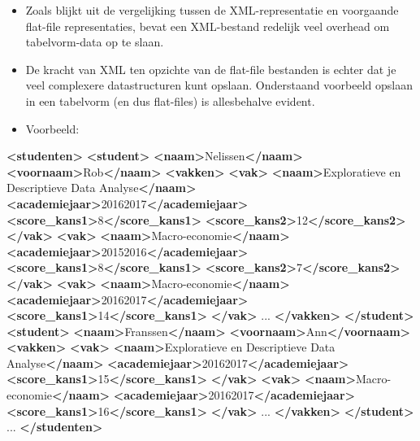 \documentclass[]{tufte-book}
\newenvironment{Shaded}{}{}
\newcommand{\KeywordTok}[1]{\textcolor[rgb]{0.00,0.44,0.13}{\textbf{#1}}}
\newcommand{\NormalTok}[1]{#1}
\providecommand{\tightlist}{%
  \setlength{\itemsep}{0pt}\setlength{\parskip}{0pt}}
\begin{document}
\begin{itemize}
\tightlist
\item
  Zoals blijkt uit de vergelijking tussen de XML-representatie en voorgaande flat-file representaties, bevat een XML-bestand redelijk veel overhead om tabelvorm-data op te slaan.
\item
  De kracht van XML ten opzichte van de flat-file bestanden is echter dat je veel complexere datastructuren kunt opslaan. Onderstaand voorbeeld opslaan in een tabelvorm (en dus flat-files) is allesbehalve evident.
\item
  Voorbeeld:
\end{itemize}

\begin{Shaded}
\begin{Highlighting}[]
\KeywordTok{<studenten>}
  \KeywordTok{<student>}
    \KeywordTok{<naam>}\NormalTok{Nelissen}\KeywordTok{</naam>}
    \KeywordTok{<voornaam>}\NormalTok{Rob}\KeywordTok{</naam>}
    \KeywordTok{<vakken>}
      \KeywordTok{<vak>}
        \KeywordTok{<naam>}\NormalTok{Exploratieve en Descriptieve Data Analyse}\KeywordTok{</naam>}
        \KeywordTok{<academiejaar>}\NormalTok{20162017}\KeywordTok{</academiejaar>}
        \KeywordTok{<score_kans1>}\NormalTok{8}\KeywordTok{</score_kans1>}
        \KeywordTok{<score_kans2>}\NormalTok{12}\KeywordTok{</score_kans2>}
      \KeywordTok{</vak>}
      \KeywordTok{<vak>}
        \KeywordTok{<naam>}\NormalTok{Macro-economie}\KeywordTok{</naam>}
        \KeywordTok{<academiejaar>}\NormalTok{20152016}\KeywordTok{</academiejaar>}
        \KeywordTok{<score_kans1>}\NormalTok{8}\KeywordTok{</score_kans1>}
        \KeywordTok{<score_kans2>}\NormalTok{7}\KeywordTok{</score_kans2>}
      \KeywordTok{</vak>}
      \KeywordTok{<vak>}
        \KeywordTok{<naam>}\NormalTok{Macro-economie}\KeywordTok{</naam>}
        \KeywordTok{<academiejaar>}\NormalTok{20162017}\KeywordTok{</academiejaar>}
        \KeywordTok{<score_kans1>}\NormalTok{14}\KeywordTok{</score_kans1>}
      \KeywordTok{</vak>}
\NormalTok{      ...}
    \KeywordTok{</vakken>}
  \KeywordTok{</student>}
  \KeywordTok{<student>}
    \KeywordTok{<naam>}\NormalTok{Franssen}\KeywordTok{</naam>}
    \KeywordTok{<voornaam>}\NormalTok{Ann}\KeywordTok{</voornaam>}
    \KeywordTok{<vakken>}
      \KeywordTok{<vak>}
        \KeywordTok{<naam>}\NormalTok{Exploratieve en Descriptieve Data Analyse}\KeywordTok{</naam>}
        \KeywordTok{<academiejaar>}\NormalTok{20162017}\KeywordTok{</academiejaar>}
        \KeywordTok{<score_kans1>}\NormalTok{15}\KeywordTok{</score_kans1>}
      \KeywordTok{</vak>}
      \KeywordTok{<vak>}
        \KeywordTok{<naam>}\NormalTok{Macro-economie}\KeywordTok{</naam>}
        \KeywordTok{<academiejaar>}\NormalTok{20162017}\KeywordTok{</academiejaar>}
        \KeywordTok{<score_kans1>}\NormalTok{16}\KeywordTok{</score_kans1>}
      \KeywordTok{</vak>}
\NormalTok{      ...}
    \KeywordTok{</vakken>}
  \KeywordTok{</student>}
\NormalTok{  ...}
\KeywordTok{</studenten>}
\end{Highlighting}
\end{Shaded}
\end{document}
